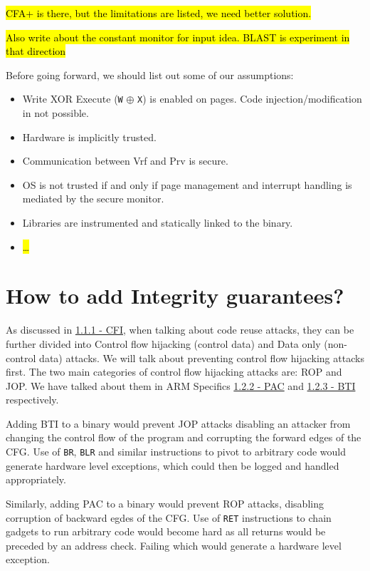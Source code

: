 \documentclass[a4paper, nobind]{templates/ociamthesis}
\providecommand{\tightlist}{%
  \setlength{\itemsep}{0pt}\setlength{\parskip}{0pt}}
\begin{document}
\hl{CFA+ is there, but the limitations are listed, we need better solution.}

\hl{Also write about the constant monitor for input idea. BLAST is experiment in that direction}

Before going forward, we should list out some of our assumptions:

\begin{itemize}
\tightlist
\item
  Write XOR Execute (\texttt{W} \(\oplus\) \texttt{X}) is enabled on pages. Code injection/modification in not possible.
\item
  Hardware is implicitly trusted.
\item
  Communication between Vrf and Prv is secure.
\item
  OS is not trusted if and only if page management and interrupt handling is mediated
  by the secure monitor.
\item
  Libraries are instrumented and statically linked to the binary.
\item
  \hl{\ldots{}}
\end{itemize}

\section{How to add Integrity guarantees?}\label{adding-integrity}

As discussed in \hyperref[cfi]{1.1.1 - CFI}, when talking about code reuse attacks, they can be further divided into
Control flow hijacking (control data) and Data only (non-control data) attacks.
We will talk about preventing control flow hijacking attacks first.
The two main categories of control flow hijacking attacks are: ROP and JOP.
We have talked about them in ARM Specifics \hyperref[pac-bg]{1.2.2 - PAC} and \hyperref[bti-bg]{1.2.3 - BTI} respectively.

Adding BTI to a binary would prevent JOP attacks disabling an attacker from changing
the control flow of the program and corrupting the forward edges of the CFG.
Use of \texttt{BR}, \texttt{BLR} and similar instructions to pivot to arbitrary code would generate hardware
level exceptions, which could then be logged and handled appropriately.

Similarly, adding PAC to a binary would prevent ROP attacks, disabling corruption
of backward egdes of the CFG.
Use of \texttt{RET} instructions to chain gadgets to run arbitrary code would become hard
as all returns would be preceded by an address check. Failing which would generate
a hardware level exception.
\end{document}
